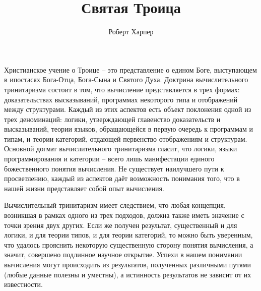 \documentclass[a4paper,12pt]{article}
\title{Святая Троица}
\author{Роберт Харпер}
\date{}
\begin{document}
\maketitle

Христианское учение о Троице -- это представление о едином Боге, выступающем в ипостасях Бога-Отца, Бога-Сына и Святого Духа. Доктрина вычислительного тринитаризма состоит в том, что вычисление представляется в трех формах: доказательствах высказываний, программах некоторого типа и отображений между структурами. Каждый из этих аспектов есть объект поклонения одной из трех деноминаций: логики, утверждающей главенство доказательств и высказываний, теории языков, обращающейся в первую очередь к программам и типам, и теории категорий, отдающей первенство отображениям и структурам. Основной догмат вычислительного тринитаризма гласит, что логики, языки программирования и категории -- всего лишь манифестации единого божественного понятия вычисления. Не существует наилучшего пути к просветлению, каждый из аспектов даёт возможность понимания того, что в нашей жизни представляет собой опыт вычисления.

Вычислительный тринитаризм имеет следствием, что любая концепция, возникшая в рамках одного из трех подходов, должна также иметь значение с точки зрения двух других. Если же получен результат, существенный и для логики, и для теории типов, и для теории категорий, то можно быть уверенным, что удалось прояснить некоторую существенную сторону понятия вычисления, а значит, совершено подлинное научное открытие. Успехи в нашем понимании вычисления могут происходить из результатов, полученных различными путями (любые данные полезны и уместны), а истинность результатов не зависит от их известности.
\end{document}
